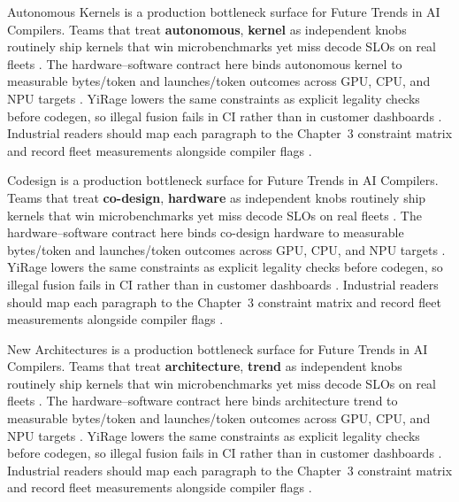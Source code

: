 Autonomous Kernels is a production bottleneck surface for Future Trends in AI Compilers. Teams that treat \textbf{autonomous}, \textbf{kernel} as independent knobs routinely ship kernels that win microbenchmarks yet miss decode SLOs on real fleets \citep{liu2024deepseekv3,memoryfloor2026}. The hardware--software contract here binds autonomous kernel to measurable bytes/token and launches/token outcomes across GPU, CPU, and NPU targets \citep{patel2025llminference,nvidia2022hopper}. YiRage lowers the same constraints as explicit legality checks before codegen, so illegal fusion fails in CI rather than in customer dashboards \citep{taxbreak2026,semianalysis2024tma}. Industrial readers should map each paragraph to the Chapter~3 constraint matrix and record fleet measurements alongside compiler flags \citep{memoryfloor2026,amd2024xdna}.

Codesign is a production bottleneck surface for Future Trends in AI Compilers. Teams that treat \textbf{co-design}, \textbf{hardware} as independent knobs routinely ship kernels that win microbenchmarks yet miss decode SLOs on real fleets \citep{patel2025llminference,nvidia2022hopper}. The hardware--software contract here binds co-design hardware to measurable bytes/token and launches/token outcomes across GPU, CPU, and NPU targets \citep{taxbreak2026,semianalysis2024tma}. YiRage lowers the same constraints as explicit legality checks before codegen, so illegal fusion fails in CI rather than in customer dashboards \citep{memoryfloor2026,amd2024xdna}. Industrial readers should map each paragraph to the Chapter~3 constraint matrix and record fleet measurements alongside compiler flags \citep{nvidia2022hopper,amd2024aie}.

New Architectures is a production bottleneck surface for Future Trends in AI Compilers. Teams that treat \textbf{architecture}, \textbf{trend} as independent knobs routinely ship kernels that win microbenchmarks yet miss decode SLOs on real fleets \citep{taxbreak2026,semianalysis2024tma}. The hardware--software contract here binds architecture trend to measurable bytes/token and launches/token outcomes across GPU, CPU, and NPU targets \citep{memoryfloor2026,amd2024xdna}. YiRage lowers the same constraints as explicit legality checks before codegen, so illegal fusion fails in CI rather than in customer dashboards \citep{nvidia2022hopper,amd2024aie}. Industrial readers should map each paragraph to the Chapter~3 constraint matrix and record fleet measurements alongside compiler flags \citep{semianalysis2024tma,dlbook}.

